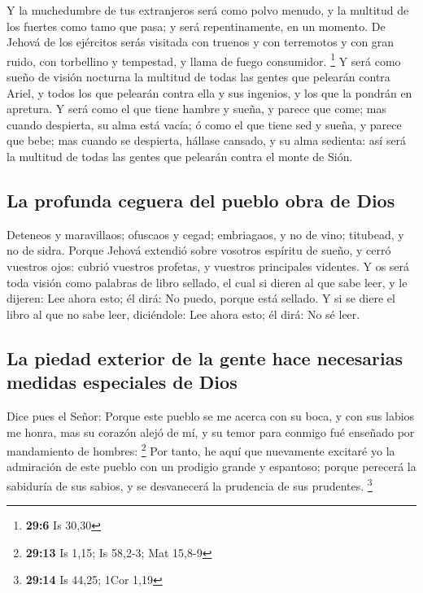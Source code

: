  Y la muchedumbre de tus extranjeros será como polvo menudo,
y la multitud de los fuertes como tamo que pasa; y será repentinamente,
en un momento.  De Jehová de los ejércitos serás visitada
con truenos y con terremotos y con gran ruido, con torbellino y
tempestad, y llama de fuego consumidor. \footnote{\textbf{29:6} Is 30,30}
 Y será como sueño de visión nocturna la multitud de todas
las gentes que pelearán contra Ariel, y todos los que pelearán contra
ella y sus ingenios, y los que la pondrán en apretura.  Y
será como el que tiene hambre y sueña, y parece que come; mas cuando
despierta, su alma está vacía; ó como el que tiene sed y sueña, y parece
que bebe; mas cuando se despierta, hállase cansado, y su alma sedienta:
así será la multitud de todas las gentes que pelearán contra el monte de
Sión.

\hypertarget{la-profunda-ceguera-del-pueblo-obra-de-dios}{%
\subsection{La profunda ceguera del pueblo obra de
Dios}\label{la-profunda-ceguera-del-pueblo-obra-de-dios}}

 Deteneos y maravillaos; ofuscaos y cegad; embriagaos, y no
de vino; titubead, y no de sidra.  Porque Jehová extendió
sobre vosotros espíritu de sueño, y cerró vuestros ojos: cubrió vuestros
profetas, y vuestros principales videntes.  Y os será toda
visión como palabras de libro sellado, el cual si dieren al que sabe
leer, y le dijeren: Lee ahora esto; él dirá: No puedo, porque está
sellado.  Y si se diere el libro al que no sabe leer,
diciéndole: Lee ahora esto; él dirá: No sé leer.

\hypertarget{la-piedad-exterior-de-la-gente-hace-necesarias-medidas-especiales-de-dios}{%
\subsection{La piedad exterior de la gente hace necesarias medidas
especiales de
Dios}\label{la-piedad-exterior-de-la-gente-hace-necesarias-medidas-especiales-de-dios}}

 Dice pues el Señor: Porque este pueblo se me acerca con su
boca, y con sus labios me honra, mas su corazón alejó de mí, y su temor
para conmigo fué enseñado por mandamiento de hombres: \footnote{\textbf{29:13}
  Is 1,15; Is 58,2-3; Mat 15,8-9}  Por tanto, he aquí que
nuevamente excitaré yo la admiración de este pueblo con un prodigio
grande y espantoso; porque perecerá la sabiduría de sus sabios, y se
desvanecerá la prudencia de sus prudentes. \footnote{\textbf{29:14} Is
  44,25; 1Cor 1,19}

